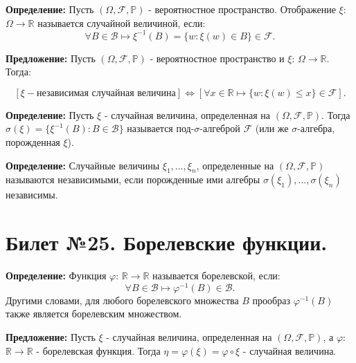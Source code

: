\textbf{Определение:} Пусть $(\Omega , \mathscr{F} , \mathbb{P})$ - вероятностное пространство. Отображение $\xi$: $\Omega \rightarrow \mathbb{R}$ называется случайной величиной, если:
\begin{equation*}
	\forall B \in \mathscr{B} \longmapsto \xi^{-1}(B) = \{w: \xi (w) \in B\} \in \mathscr{F}.
\end{equation*}

\textbf{Предложение:} Пусть $(\Omega , \mathscr{F} , \mathbb{P})$ - вероятностное пространство и $\xi$: $\Omega \rightarrow \mathbb{R}$. Тогда:

\begin{equation*}
	\left[\xi - \text{независимая случайная величина}\right] \Longleftrightarrow \left[\forall x \in \mathbb{R} \longmapsto \{w: \xi (w) \leqslant x\} \in \mathscr{F}\right].
\end{equation*}

\textbf{Определение:} Пусть $\xi$ - случайная величина, определенная на $(\Omega , \mathscr{F} , \mathbb{P})$. Тогда $\sigma (\xi) = \{\xi^{-1}(B): B \in \mathscr{B}\}$ называется под-$\sigma$-алгеброй $\mathscr{F}$ (или же $\sigma$-алгебра, порожденная $\xi$).
\vspace{5mm}

\textbf{Определение:} Случайные величины $\xi_{1}, \dots , \xi_{n}$, определенные на $(\Omega , \mathscr{F} , \mathbb{P})$ называются независимыми, если порожденные ими алгебры $\sigma (\xi_{1}), \dots , \sigma (\xi_{n})$ независимы.

\section{Билет №25. Борелевские функции.}

\hspace{\parindent}\textbf{Определение:} Функция $\varphi$: $\mathbb{R} \rightarrow \mathbb{R}$ называется борелевской, если:
\begin{equation*}
	\forall B \in \mathscr{B} \longmapsto \varphi^{-1}(B) \in \mathscr{B}.
\end{equation*}
Другими словами, для любого борелевского множества $B$ прообраз $\varphi^{-1}(B)$ также является борелевским множеством.
\vspace{5mm}

\textbf{Предложение:} Пусть $\xi$ - случайная величина, определенная на $(\Omega , \mathscr{F} , \mathbb{P})$, а $\varphi$: $\mathbb{R} \rightarrow \mathbb{R}$ - борелевская функция. Тогда $\eta = \varphi (\xi) = \varphi \circ \xi$ - случайная величина.

